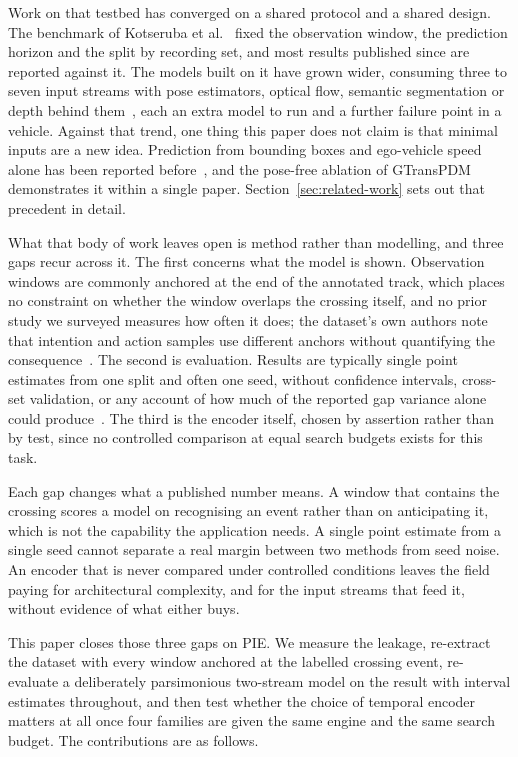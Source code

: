 \documentclass[mti,article,submit,moreauthors]{Definitions/mdpi}
\begin{document}
Work on that testbed has converged on a shared protocol and a shared design. The benchmark of Kotseruba et al.~\citep{kotseruba2021benchmark} fixed the observation window, the prediction horizon and the split by recording set, and most results published since are reported against it. The models built on it have grown wider, consuming three to seven input streams with pose estimators, optical flow, semantic segmentation or depth behind them~\citep{azarmi2025pipnet,zhou2023pit}, each an extra model to run and a further failure point in a vehicle. Against that trend, one thing this paper does not claim is that minimal inputs are a new idea. Prediction from bounding boxes and ego-vehicle speed alone has been reported before~\citep{chen2024pedcmt,achaji2022attention}, and the pose-free ablation of GTransPDM~\citep{xie2025gtranspdm} demonstrates it within a single paper. Section~\ref{sec:related-work} sets out that precedent in detail.

What that body of work leaves open is method rather than modelling, and three gaps recur across it. The first concerns what the model is shown. Observation windows are commonly anchored at the end of the annotated track, which places no constraint on whether the window overlaps the crossing itself, and no prior study we surveyed measures how often it does; the dataset's own authors note that intention and action samples use different anchors without quantifying the consequence~\citep{rasouli2024diving}. The second is evaluation. Results are typically single point estimates from one split and often one seed, without confidence intervals, cross-set validation, or any account of how much of the reported gap variance alone could produce~\citep{bouthillier2021variance}. The third is the encoder itself, chosen by assertion rather than by test, since no controlled comparison at equal search budgets exists for this task.

Each gap changes what a published number means. A window that contains the crossing scores a model on recognising an event rather than on anticipating it, which is not the capability the application needs. A single point estimate from a single seed cannot separate a real margin between two methods from seed noise. An encoder that is never compared under controlled conditions leaves the field paying for architectural complexity, and for the input streams that feed it, without evidence of what either buys.

This paper closes those three gaps on PIE. We measure the leakage, re-extract the dataset with every window anchored at the labelled crossing event, re-evaluate a deliberately parsimonious two-stream model on the result with interval estimates throughout, and then test whether the choice of temporal encoder matters at all once four families are given the same engine and the same search budget. The contributions are as follows.
\end{document}
